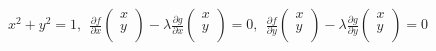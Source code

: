 \documentclass[dvipdfmx]{jsarticle}
\begin{document}
\begin{align*}
x^{2} + y^{2} = 1,\ \ \frac{\partial f}{\partial x}\begin{pmatrix}
x \\
y \\
\end{pmatrix} - \lambda\frac{\partial g}{\partial x}\begin{pmatrix}
x \\
y \\
\end{pmatrix} = 0,\ \ \frac{\partial f}{\partial y}\begin{pmatrix}
x \\
y \\
\end{pmatrix} - \lambda\frac{\partial g}{\partial y}\begin{pmatrix}
x \\
y \\
\end{pmatrix} = 0
\end{align*}
\end{document}
